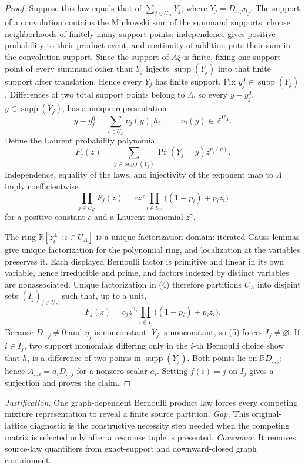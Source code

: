 \documentclass{article}
\begin{document}
\begin{proof}
Suppose this law equals that of \(\sum_{j\in U_D}Y_j\), where \(Y_j=D_{:,j}\eta_j\). The support of a convolution contains the Minkowski sum of the summand supports: choose neighborhoods of finitely many support points; independence gives positive probability to their product event, and continuity of addition puts their sum in the convolution support. Since the support of \(A\xi\) is finite, fixing one support point of every summand other than \(Y_j\) injects \(\operatorname{supp}(Y_j)\) into that finite support after translation. Hence every \(Y_j\) has finite support. Fix \(y_j^0\in\operatorname{supp}(Y_j)\). Differences of two total support points belong to \(\Lambda\), so every \(y-y_j^0\), \(y\in\operatorname{supp}(Y_j)\), has a unique representation
\[
y-y_j^0=\sum_{i\in U_A}\nu_j(y)_ih_i,
\qquad \nu_j(y)\in\mathbb Z^{U_A}.
\]
Define the Laurent probability polynomial
\[
F_j(z)=\sum_{y\in\operatorname{supp}(Y_j)}\Pr(Y_j=y)z^{\nu_j(y)}.
\]
Independence, equality of the laws, and injectivity of the exponent map to \(\Lambda\) imply coefficientwise
\[
\prod_{j\in U_D}F_j(z)=c z^\gamma\prod_{i\in U_A}\bigl((1-p_i)+p_i z_i\bigr) \tag{4}
\]
for a positive constant \(c\) and a Laurent monomial \(z^\gamma\).

The ring \(\mathbb R[z_i^{\pm1}:i\in U_A]\) is a unique-factorization domain: iterated Gauss lemmas give unique factorization for the polynomial ring, and localization at the variables preserves it. Each displayed Bernoulli factor is primitive and linear in its own variable, hence irreducible and prime, and factors indexed by distinct variables are nonassociated. Unique factorization in (4) therefore partitions \(U_A\) into disjoint sets \((I_j)_{j\in U_D}\) such that, up to a unit,
\[
F_j(z)=c_jz^{\gamma_j}\prod_{i\in I_j}\bigl((1-p_i)+p_i z_i\bigr). \tag{5}
\]
Because \(D_{:,j}\ne0\) and \(\eta_j\) is nonconstant, \(Y_j\) is nonconstant, so (5) forces \(I_j\ne\varnothing\). If \(i\in I_j\), two support monomials differing only in the \(i\)-th Bernoulli choice show that \(h_i\) is a difference of two points in \(\operatorname{supp}(Y_j)\). Both points lie on \(\mathbb RD_{:,j}\); hence \(A_{:,i}=a_iD_{:,j}\) for a nonzero scalar \(a_i\). Setting \(f(i)=j\) on \(I_j\) gives a surjection and proves the claim.
\end{proof}
\par\smallskip\noindent \textit{Justification.} One graph-dependent Bernoulli product law forces every competing mixture representation to reveal a finite source partition. \textit{Gap.} This original-lattice diagnostic is the constructive necessity step needed when the competing matrix is selected only after a response tuple is presented. \textit{Consumer.} It removes source-law quantifiers from exact-support and downward-closed graph containment.
\end{document}

